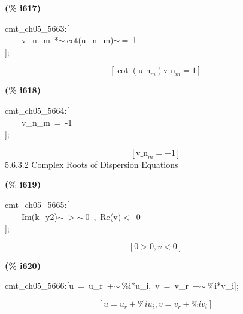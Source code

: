 \documentclass[fleqn]{article}
\begin{document}
\noindent
\begin{minipage}[t]{4.000000em}\color{red}\bfseries
(\% i617)	
\end{minipage}
\begin{minipage}[t]{\textwidth}\color{blue}
cmt\_ch05\_5663:[\\
\ \ \ \ v\_n\_m\ *\ensuremath{\sim\ }cot(u\_n\_m)\ensuremath{\sim\ }=\ 1\\
];
\end{minipage}
\[\displaystyle \tag{\% o617} 
\left[ \cot{\left( {{\ensuremath{\mathrm{u\_ n}}}_m}\right) } {{\ensuremath{\mathrm{v\_ n}}}_m}=1\right] \mbox{}
\]


\noindent
\begin{minipage}[t]{4.000000em}\color{red}\bfseries
(\% i618)	
\end{minipage}
\begin{minipage}[t]{\textwidth}\color{blue}
cmt\_ch05\_5664:[\\
\ \ \ \ v\_n\_m\ =\ -1\\
];
\end{minipage}
\[\displaystyle \tag{\% o618} 
\left[ {{\ensuremath{\mathrm{v\_ n}}}_m}=-1\right] \mbox{}
\]
5.6.3.2     Complex Roots of Dispersion Equations


\noindent
\begin{minipage}[t]{4.000000em}\color{red}\bfseries
(\% i619)	
\end{minipage}
\begin{minipage}[t]{\textwidth}\color{blue}
cmt\_ch05\_5665:[\\
\ \ \ \ Im(k\_y2)\ensuremath{\sim\ }\ensuremath{>}\ensuremath{\sim\ }0\ ,\ Re(v)\ensuremath{<}\ 0\\
];
\end{minipage}
\[\displaystyle \tag{\% o619} 
\left[ 0\operatorname{>  }0\operatorname{,}v\operatorname{<  }0\right] \mbox{}
\]


\noindent
\begin{minipage}[t]{4.000000em}\color{red}\bfseries
(\% i620)	
\end{minipage}
\begin{minipage}[t]{\textwidth}\color{blue}
cmt\_ch05\_5666:[u\ =\ u\_r\ +\ensuremath{\sim\ }\%i*u\_i,\ v\ =\ v\_r\ +\ensuremath{\sim\ }\%i*v\_i];
\end{minipage}
\[\displaystyle \tag{\% o620} 
\left[ u={u_r}+\% i {u_i}\operatorname{,}v={v_r}+\% i {v_i}\right] \mbox{}
\]
\end{document}
